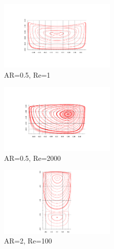 \documentclass[twocolumn,10pt]{asme2ej}
\begin{document}
\begin{figure}[tb]
\begin{center}
\includegraphics[width=0.5\textwidth]{figure/AR0.5-Re1 streamFunction axis final.pdf}
\caption{AR=0.5, Re=1}
\label{}
\end{center}
\end{figure}

\begin{figure}[tb]
\begin{center}
\includegraphics[width=0.5\textwidth]{figure/AR0.5-Re2000 streamFunction axis final.pdf}
\caption{AR=0.5, Re=2000}
\label{}
\end{center}
\end{figure}

\begin{figure}[tb]
\begin{center}
\includegraphics[width=0.5\textwidth]{figure/AR2-Re100 streamFunction axis final.pdf}
\caption{AR=2, Re=100}
\label{}
\end{center}
\end{figure}
\end{document}
